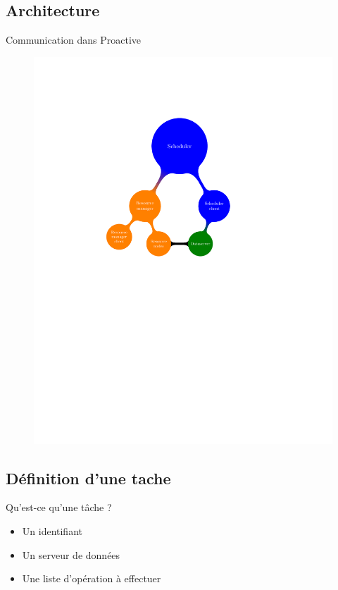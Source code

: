 \documentclass{beamer}
\begin{document}
\subsection{Architecture}

\begin{frame}{Communication dans Proactive}
    \begin{figure}
        \centering
        \includegraphics[trim=4cm 13cm 4cm 4cm,scale=0.62]{netmap_abs.pdf}
    \end{figure}
    
\end{frame}

\subsection{Définition d'une tache}
\begin{frame}
        \begin{block}{Qu'est-ce qu'une t\^ache ?}
            \begin{itemize}
                \item Un identifiant
                \item Un serveur de données
                \item Une liste d'opération à effectuer %
            \end{itemize}
        \end{block}
\end{frame}
\end{document}
